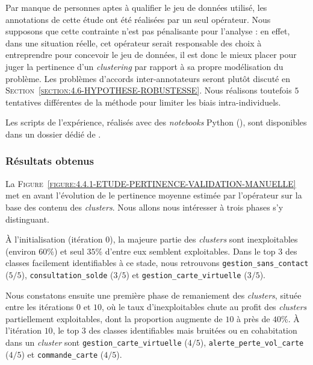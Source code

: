			\begin{leftBarWarning}
				Par manque de personnes aptes à qualifier le jeu de données utilisé, les annotations de cette étude ont été réalisées par un seul opérateur.
				Nous supposons que cette contrainte n'est pas pénalisante pour l'analyse : en effet, dans une situation réelle, cet opérateur serait responsable des choix à entreprendre pour concevoir le jeu de données, il est donc le mieux placer pour juger la pertinence d'un \textit{clustering} par rapport à sa propre modélisation du problème.
				Les problèmes d'accords inter-annotateurs seront plutôt discuté en \textsc{Section~\ref{section:4.6-HYPOTHESE-ROBUSTESSE}}.
				Nous réalisons toutefois $5$ tentatives différentes de la méthode pour limiter les biais intra-individuels.
			\end{leftBarWarning}
			
			\begin{leftBarInformation}
				Les scripts de l'expérience, réalisés avec des \textit{notebooks} Python (\cite{van-rossum-drake:2009:python-reference-manual}), sont disponibles dans un dossier dédié de \cite{schild:2021:cognitivefactory-interactiveclusteringcomparativestudy}.
			\end{leftBarInformation}
			

		\subsubsection{Résultats obtenus}
		
			La \textsc{Figure~\ref{figure:4.4.1-ETUDE-PERTINENCE-VALIDATION-MANUELLE}} met en avant l'évolution de le pertinence moyenne estimée par l'opérateur sur la base des contenu des \textit{clusters}.
			Nous allons nous intéresser à trois phases s'y distinguant.
			
			À l'initialisation (itération $0$), la majeure partie des \textit{clusters} sont inexploitables (environ $60$\%) et seul $35$\% d'entre eux semblent exploitables.
			Dans le top $3$ des classes facilement identifiables à ce stade, nous retrouvons \texttt{gestion\_sans\_contact} ($5/5$), \texttt{consultation\_solde} ($3/5$) et \texttt{gestion\_carte\_virtuelle} ($3/5$).
			
			Nous constatons ensuite une première phase de remaniement des \textit{clusters}, située entre les itérations $0$ et $10$, où le taux d'inexploitables chute au profit des \textit{clusters} partiellement exploitables, dont la proportion augmente de $10$ à près de $40$\%.
			À l'itération $10$, le top $3$ des classes identifiables mais bruitées ou en cohabitation dans un \textit{cluster} sont \texttt{gestion\_carte\_virtuelle} ($4/5$),  \texttt{alerte\_perte\_vol\_carte} ($4/5$) et  \texttt{commande\_carte} ($4/5$).
			
